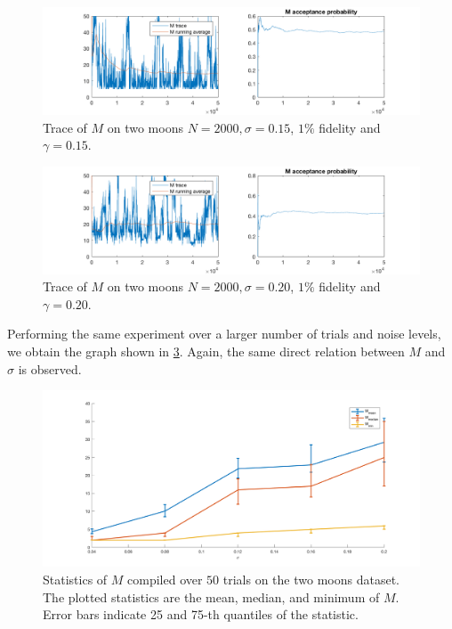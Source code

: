 \documentclass{siamart1116}
\begin{document}
        \begin{figure}[!htb]
            \centering
            \caption{\label{taM_M_moons_1}Trace of $M$ on two moons $N=2000, \sigma = 0.15$, $1\%$ fidelity and $\gamma = 0.15$.}
            \includegraphics[width=0.8\linewidth]{M_observations/sigma_15.png}
        \end{figure}

        \begin{figure}[!htb]
            \centering
            \caption{\label{taM_M_moons_2}Trace of $M$ on two moons $N=2000, \sigma = 0.20$, $1\%$ fidelity and $\gamma = 0.20$.}
            \includegraphics[width=0.8\linewidth]{M_observations/sigma_20.png}
        \end{figure}

        Performing the same experiment over a larger number of trials and noise levels, we obtain the graph shown in \cref{taM_M_moons_3}. Again, the same direct relation between $M$ and $\sigma$ is observed.

        \begin{figure}[!htb]
        \centering
        \caption{\label{taM_M_moons_3}Statistics of $M$ compiled over $50$ trials on the two moons dataset. The plotted statistics are the mean, median, and minimum of $M$. Error bars indicate 25 and 75-th quantiles of the statistic.}
        \includegraphics[width=0.8\linewidth]{M_observations/all_M_sigma.png}
        \end{figure}
\end{document}
